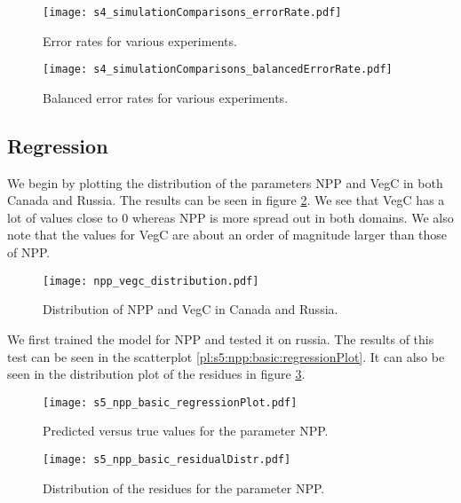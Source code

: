 \begin{figure}[h]
  \centering
  \begin{minipage}{0.45\textwidth}
    \centering
    \texttt{[image: s4\_simulationComparisons\_errorRate.pdf]}
    \caption{Error rates for various experiments.}
    \label{pl:s4_simulationComparisons_errorRate}
  \end{minipage}
  \hfill
  \begin{minipage}{0.45\textwidth}
    \centering
    \texttt{[image: s4\_simulationComparisons\_balancedErrorRate.pdf]}
    \caption{Balanced error rates for various experiments.}
    \label{pl:s4_simulationComparisons_balancedErrorRate}
  \end{minipage}
\end{figure}


\pagebreak
\subsection{Regression}

We begin by plotting the distribution of the parameters NPP and VegC in both Canada and Russia. The results can be
seen in figure \ref{pl:npp_vegc_distribution}. We see that VegC has a lot of values close to 0 whereas NPP is more spread out
in both domains. We also note that the values for VegC are about an order of magnitude larger than those of NPP.
\begin{figure}[h]
  \centering
  \texttt{[image: npp\_vegc\_distribution.pdf]}
  \caption{Distribution of NPP and VegC in Canada and Russia.}
  \label{pl:npp_vegc_distribution}
\end{figure}

We first trained the model for NPP and tested it on russia. The results of this test
can be seen in the scatterplot \ref{pl:s5:npp:basic:regressionPlot}. It can also be seen in the distribution
plot of the residues in figure \ref{pl:s5:npp:basic:residualDistr}.
\begin{figure}[h]
  \centering
  \begin{minipage}{0.45\textwidth}
    \centering
    \texttt{[image: s5\_npp\_basic\_regressionPlot.pdf]}
    \caption{Predicted versus true values for the parameter NPP.}
    \label{pl:s5:npp:basic:regressionPlot}
  \end{minipage}
  \hfill
  \begin{minipage}{0.45\textwidth}
    \centering
    \texttt{[image: s5\_npp\_basic\_residualDistr.pdf]}
    \caption{Distribution of the residues for the parameter NPP.}
    \label{pl:s5:npp:basic:residualDistr}
  \end{minipage}
\end{figure}


